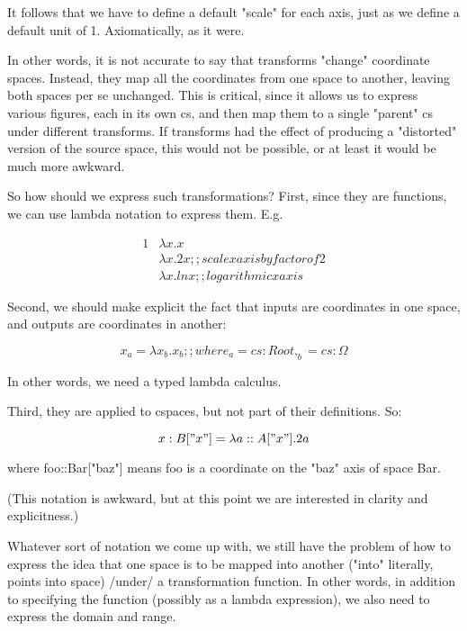 \documentclass[12pt]{tufte-handout}
\numberwithin{equation}{subsection}
\numberwithin{equation}{subsection}
\begin{document}
  It follows that we have to define a default "scale" for each axis,
  just as we define a default unit of 1.  Axiomatically, as it were.

  In other words, it is not accurate to say that transforms "change"
  coordinate spaces.  Instead, they map all the coordinates from one
  space to another, leaving both spaces per se unchanged.  This is
  critical, since it allows us to express various figures, each in its
  own cs, and then map them to a single "parent" cs under different
  transforms.  If transforms had the effect of producing a "distorted"
  version of the source space, this would not be possible, or at least
  it would be much more awkward.

  So how should we express such transformations?  First, since they are
  functions, we can use lambda notation to express them.  E.g.

  {
    \begin{alignat}{1}
      & \lambda x.x \\
      & \lambda x.2x   ;; scale x axis by factor of 2 \\
      & \lambda x.ln x ;; logarithmic x axis
    \end{alignat}
  }

  Second, we should make explicit the fact that inputs are coordinates
  in one space, and outputs are coordinates in another:

  $$x_a = \lambda x_b.x_b  ;; where _a = cs:Root, _b = cs:\Omega$$

  In other words, we need a typed lambda calculus.

  Third, they are applied to cspaces, but not part of their definitions.
  So:

  \begin{equation}
    x:B["x"] = \lambda a::A["x"].2a
  \end{equation}


  where foo::Bar["baz"] means foo is a coordinate on the "baz" axis of space Bar.

  (This notation is awkward, but at this point we are interested in
  clarity and explicitness.)

  Whatever sort of notation we come up with, we still have the problem
  of how to express the idea that one space is to be mapped into another
  ("into" literally, points into space) /under/ a transformation
  function.  In other words, in addition to specifying the function
  (possibly as a lambda expression), we also need to express the domain
  and range.
\end{document}
